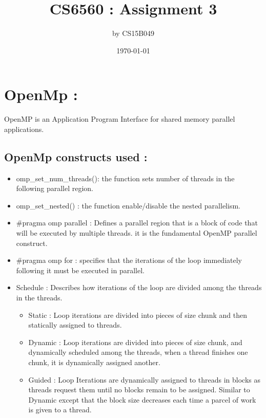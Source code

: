 \documentclass[a4paper,10pt]{article}
\title{CS6560 : Assignment 3 }
\author{by CS15B049}
\date{\today}
\begin{document}
\maketitle

\section{OpenMp : }
OpenMP is an Application Program Interface for  shared memory parallel applications.
\subsection{OpenMp constructs used :}
\begin{itemize}
 \item omp\_set\_num\_threads(): the function sets number of threads in the following parallel region.
 \item omp\_set\_nested() : the function enable/disable the nested parallelism.
 
 \item \#pragma omp parallel : Defines a parallel region  that is a block of code that will be executed by multiple threads. it  is the fundamental OpenMP parallel construct.
 
 \item \#pragma omp for : specifies that the iterations of the loop immediately following it must be executed in parallel.
 
 \item Schedule :  Describes how iterations of the loop are divided among the threads in the threads.  \begin{itemize}
                 \item Static : Loop iterations are divided into pieces of size chunk and then statically assigned to threads.
                 
                \item Dynamic : Loop iterations are divided into pieces of size chunk, and dynamically scheduled among the threads, when a thread finishes one chunk, it is dynamically assigned another.
                
                \item Guided : Loop Iterations are dynamically assigned to threads in blocks as threads request them until no blocks remain to be assigned. Similar to Dynamic except that the block size decreases each time a parcel of work is given to a thread.
                \end{itemize}

 
\end{itemize}
\end{document}
